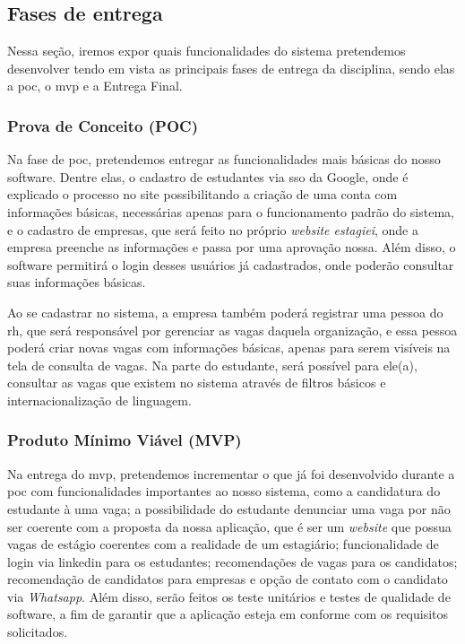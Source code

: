 \subsection{Fases de entrega}

Nessa seção, iremos expor quais funcionalidades do sistema pretendemos desenvolver tendo em vista as principais fases de entrega da disciplina, sendo elas a \ac{poc}, o \ac{mvp} e a Entrega Final.

\subsubsection{Prova de Conceito (POC)}

Na fase de \ac{poc}, pretendemos entregar as funcionalidades mais básicas do nosso software. Dentre elas, o cadastro de estudantes via \ac{sso} da Google, onde é explicado o processo no site possibilitando a criação de uma conta com informações básicas, necessárias apenas para o funcionamento padrão do sistema, e o cadastro de empresas, que será feito no próprio \emph{website estagiei}, onde a empresa preenche as informações e passa por uma aprovação nossa. Além disso, o software permitirá o login desses usuários já cadastrados, onde poderão consultar suas informações básicas.

Ao se cadastrar no sistema, a empresa também poderá registrar uma pessoa do \ac{rh}, que será responsável por gerenciar as vagas daquela organização, e essa pessoa poderá criar novas vagas com informações básicas, apenas para serem visíveis na tela de consulta de vagas. Na parte do estudante, será possível para ele(a), consultar as vagas que existem no sistema através de filtros básicos e internacionalização de linguagem.

\subsubsection{Produto Mínimo Viável (MVP)}

Na entrega do \ac{mvp}, pretendemos incrementar o que já foi desenvolvido durante a \ac{poc} com funcionalidades importantes ao nosso sistema, como a candidatura do estudante à uma vaga; a possibilidade do estudante denunciar uma vaga por não ser coerente com a proposta da nossa aplicação, que é ser um \emph{website} que possua vagas de estágio coerentes com a realidade de um estagiário; funcionalidade de login via \gls{linkedin} para os estudantes; recomendações de vagas para os candidatos; recomendação de candidatos para empresas e opção de contato com o candidato via \emph{Whatsapp}. Além disso, serão feitos os teste unitários e testes de qualidade de software, a fim de garantir que a aplicação esteja em conforme com os requisitos solicitados.

